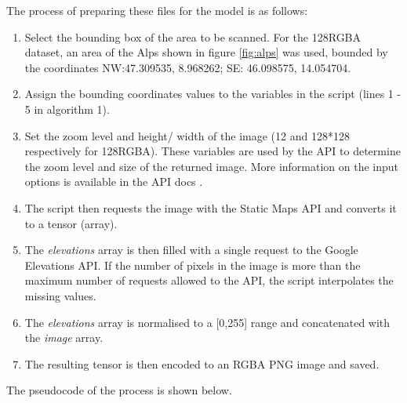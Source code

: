 \documentclass[a4paper]{report}
\begin{document}
The process of preparing these files for the model is as follows:
\begin{enumerate}
    \item Select the bounding box of the area to be scanned. For the 128RGBA dataset, an area of the Alps shown in figure \ref{fig:alps} was used, bounded by the coordinates NW:47.309535, 8.968262; SE: 46.098575, 14.054704.
    \item Assign the bounding coordinates values to the variables in the script (lines 1 - 5 in algorithm 1).
    \item Set the zoom level and height/ width of the image (12 and 128*128 respectively for 128RGBA). These variables are used by the API to determine the zoom level and size of the returned image. More information on the input options is available in the API docs \cite{docs}.
    \item The script then requests the image with the Static Maps API and converts it to a tensor (array).
    \item The \textit{elevations} array is then filled with a single request to the Google Elevations API. If the number of pixels in the image is more than the maximum number of requests allowed to the API, the script interpolates the missing values.
    \item The \textit{elevations} array is normalised to a [0,255] range and concatenated with the \textit{image} array.
    \item The resulting tensor is then encoded to an RGBA PNG image and saved.
\end{enumerate}

The pseudocode of the process is shown below.
\end{document}
